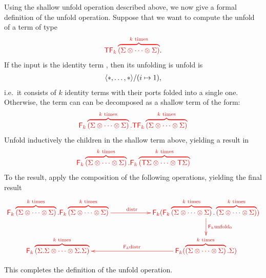 \newcommand{\expmatrix}[1]{\reduce k \kpower{#1}}
\newcommand{\kpower}[1]{ \overbrace{(#1 \otimes \cdots \otimes #1)}^{\text{$k$ times}}}


Using the shallow unfold operation described above, we now give a formal definition of the unfold operation. Suppose that we want to compute the unfold of a term of type 
\begin{align*}
\ranked{\tmonad \expmatrix \Sigma}.
\end{align*}
If the input is the identity term ,  then its unfolding
 is  unfold is 
\begin{align*}
    \langle{*,\ldots,*}\rangle/(i \mapsto 1),
\end{align*}
i.e.~it consists of $k$ identity terms with their ports folded into a single one.  Otherwise, the term can can be decomposed as a shallow term of the form: 
\begin{align*}
 \ranked{
    \shallowterm{ \expmatrix \Sigma} { \tmonad \expmatrix \Sigma}
}
\end{align*}
Unfold inductively  the children in the shallow term above, yielding a result in
\begin{align*}
   \ranked{
        \shallowterm{ \expmatrix \Sigma} {  \expmatrix {\tmonad \Sigma}}
    }
    \end{align*}
To the result, apply the composition of the following operations, yielding the final result
\begin{align*}
\ranked{
    \xymatrix@C=2cm{
        \shallowterm{\expmatrix \Sigma}{\expmatrix  \Sigma} \ar[r]^{\distrfold} &
        \reduce k (\shallowterm {\expmatrix \Sigma } {\kpower \Sigma}) \ar[d]^-{\reduce k \unfoldsmall}\\
        \reduce k \kpower{\shallowterm \Sigma \Sigma} &
        \reduce k (\shallowterm {\kpower \Sigma} \Sigma) \ar[l]_{\reduce k \distrtensor}
    }
}
\end{align*}

This completes the definition of the unfold operation. 